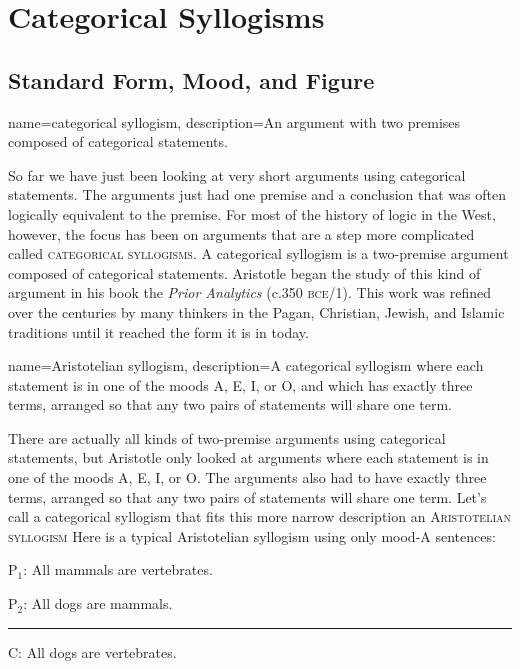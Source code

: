 \chapter{Categorical Syllogisms}
\label{chap:cat_syllogisms}
\setlength{\parindent}{1em}


\section{Standard Form, Mood, and Figure}
\label{sec:form_mood_figure}
{
name=categorical syllogism,
description={An argument with two premises composed of categorical statements.}
}


So far we have just been looking at very short arguments using categorical statements. The arguments just had one premise and a conclusion that was often logically equivalent to the premise. For most of the history of logic in the West, however, the focus has been on arguments that are a step more complicated called \textsc{\glspl{categorical syllogism}}. A categorical syllogism is a two-premise argument composed of categorical statements. Aristotle began the study of this kind of argument in his book the \textit{Prior Analytics} (c.350 \textsc{bce}/1\citeyear{Aristotle1984b}). This work was refined over the centuries by many thinkers in the Pagan, Christian, Jewish, and Islamic traditions until it reached the form it is in today.

{
name=Aristotelian syllogism,
description={A categorical syllogism where each statement is in one of the moods A, E, I, or O, and which has exactly three terms, arranged so that any two pairs of statements will share one term.}
}


There are actually all kinds of two-premise arguments using categorical statements, but Aristotle only looked at arguments where each statement is in one of the moods A, E, I, or O. The arguments also had to have exactly three terms, arranged so that any two pairs of statements will share one term. Let's call a categorical syllogism that fits this more narrow description an \textsc{\gls{Aristotelian syllogism}} Here is a typical Aristotelian syllogism using only mood-A sentences:

\begin{earg}
\item[P$_1$:] All mammals are vertebrates.
\item[P$_2$:] All dogs are mammals.
\vspace{-.5em}
\item [] \rule{0.3\linewidth}{.5pt} 
\item[C:] All dogs are vertebrates. 
\end{earg} 
\label{AAA_arg}

